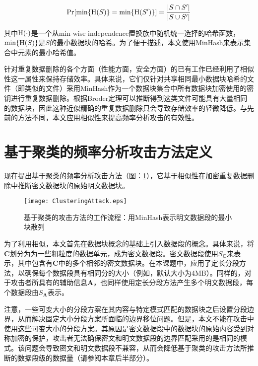 \begin{eqnarray}
	\Pr[\min\{{\rm H}(S)\} = \min\{{\rm H}(S')\} ] = \frac{|S \cap S'|}{|S \cup S'|}
	\label{eq:similary}
\end{eqnarray}

其中${\rm H}(\cdot)$是一个从min-wise independence置换族中随机统一选择的哈希函数，$\min\{{\rm H}(S)\}$是$S$的最小数据块的哈希。为了便于描述，本文使用MinHash来表示集合中元素的最小哈希值。


针对重复数据删除的各个方面（性能方面\cite{qin2017design,xia2011silo,bhagwat2009extreme}，安全方面\cite{li2017information}）的已有工作已经利用了相似性这一属性来保持存储效率。具体来说，它们仅针对共享相同最小数据块哈希的文件（即类似的文件）采用MinHash作为一个数据块集合中所有数据块加密使用的密钥进行重复数据删除。根据Broder定理可以推断得到这类文件可能具有大量相同的数据块，因此这种近似精确的重复数据删除只会导致存储效率的轻微降低。与先前的方法不同\cite{qin2017design,xia2011silo,bhagwat2009extreme,li2017information}，本文应用相似性来提高频率分析攻击的有效性。
 
\section{基于聚类的频率分析攻击方法定义}
\label{sec:clustering-attack-description}

现在提出基于聚类的频率分析攻击方法（图：\ref{fig:基于聚类的攻击方法的工作流程}），它基于相似性在加密重复数据删除中推断密文数据块的原始明文数据块。

\begin{figure}[!htb]
    \small
    \centering
    \texttt{[image: ClusteringAttack.eps]}
    \caption{基于聚类的攻击方法的工作流程：用MinHash表示明文数据段的最小块散列} 
    \label{fig:基于聚类的攻击方法的工作流程}
\end{figure}

为了利用相似，本文首先在数据块概念的基础上引入数据段的概念。具体来说，将$\mathbf{C}$划分为为一些粗粒度的数据单元，成为密文数据段。密文数据段使用$S_\mathbf{C}$来表示，其中包含有$\mathbf{C}$中的多个相邻的密文数据块。在本课题中，应用了定长分段方法，以确保每个数据段具有相同分的大小（例如，默认大小为4MB）。同样的，对于攻击者所具有的辅助信息$\mathbf{A}$，也同样使用定长分段方法产生多个明文数据段，每个数据段由$S_\mathbf{A}$表示。

注意，一些可变大小的分段方案\cite{lillibridge2009sparse,qin2017design}在其内容与特定模式匹配的数据块之后设置分段边界，从而解决固定大小分段方案所面临的边界移位问题。但是，本文不能在攻击中使用这些可变大小的分段方案\cite{lillibridge2009sparse,qin2017design}。其原因是密文数据段中的数据块的原始内容受到对称加密的保护，攻击者无法确保密文和明文数据段的边界匹配采用的是相同的模式。该问题会导致密文和明文数据段不兼容，从而会降低基于聚类的攻击方法所推断的数据段级的数据量（请参阅本章后半部分）。
 
